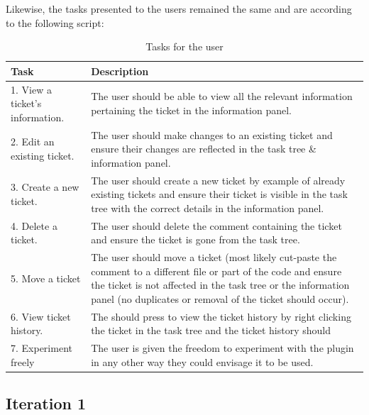\documentclass{4thYearProject}
\begin{document}
Likewise, the tasks presented to the users remained the same and are according to the following script:

\begin{table}[H]
\centering
\def\arraystretch{1.5}
\begin{tabular}{p{5cm}p{10cm}}
\hline
Task & Description\\
\hline
1. View a ticket's information. & The user should be able to view all the relevant information pertaining the ticket in the information panel. \\
2. Edit an existing ticket. & The user should make changes to an existing ticket and ensure their changes are reflected in the task tree \& information panel. \\
3. Create a new ticket. & The user should create a new ticket by example of already existing tickets and ensure their ticket is visible in the task tree with the correct details in the information panel.  \\
4. Delete a ticket. & The user should delete the comment containing the ticket and ensure the ticket is gone from the task tree. \\
5. Move a ticket & The user should move a ticket (most likely cut-paste the comment to a different file or part of the code and ensure the ticket is not affected in the task tree or the information panel (no duplicates or removal of the ticket should occur).\\
6. View ticket history. & The should press to view the ticket history by right clicking the ticket in the task tree and the ticket history should \\ 
7. Experiment freely & The user is given the freedom to experiment with the plugin in any other way they could envisage it to be used. \\
\hline
\end{tabular}
\caption{Tasks for the user}
\label{table:userevaltasks}
\end{table}

\subsection{Iteration 1}
\end{document}
